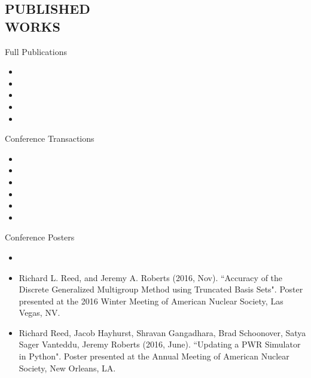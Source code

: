 \documentclass[margin, 10pt]{res} %
\begin{document}
\begin{resume}
\section{PUBLISHED \\ WORKS}
Full Publications
\begin{itemize}
\item {}
\item {}
\item {}
\item {}
\item {}
\end{itemize}
Conference Transactions
\begin{itemize}
\item {}
\item {}
\item {}
\item {}
\item {}
\item {}
\end{itemize}
Conference Posters
\begin{itemize}
\item {}
\item Richard L. Reed, and Jeremy A. Roberts (2016, Nov). ``Accuracy of the Discrete Generalized Multigroup Method using Truncated Basis Sets". Poster presented at the 2016 Winter Meeting of American Nuclear Society, Las Vegas, NV.
\item Richard Reed, Jacob Hayhurst, Shravan Gangadhara, Brad Schoonover, Satya Sager Vanteddu, Jeremy Roberts (2016, June). ``Updating a PWR Simulator in Python". Poster presented at the Annual Meeting of American Nuclear Society, New Orleans, LA.
\end{itemize}

\end{resume}
\end{document}
